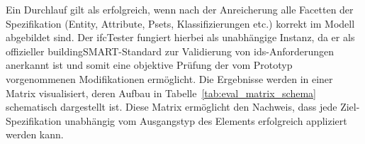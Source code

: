 Ein Durchlauf gilt als erfolgreich, wenn nach der Anreicherung alle Facetten der 
Spezifikation (Entity, Attribute, Psets, Klassifizierungen etc.) korrekt im Modell 
abgebildet sind. Der \gls{ifc}Tester fungiert hierbei 
als unabhängige Instanz, da er als offizieller buildingSMART-Standard 
zur Validierung von \gls{ids}-Anforderungen anerkannt ist und somit eine objektive 
Prüfung der vom Prototyp vorgenommenen Modifikationen ermöglicht.
Die Ergebnisse werden in einer Matrix visualisiert, deren Aufbau in Tabelle~\ref{tab:eval_matrix_schema} schematisch dargestellt ist. 
Diese Matrix ermöglicht den Nachweis, dass jede Ziel-Spezifikation unabhängig vom Ausgangstyp des Elements erfolgreich appliziert werden kann.

\begin{table}[ht]
\centering
\caption{Schematischer Aufbau der Matrix zur Evaluation der Zielzustand-Konformität.}
\label{tab:eval_matrix_schema}
\end{table}

